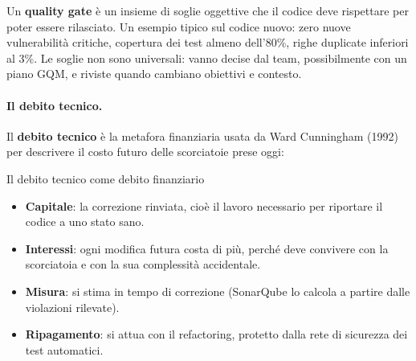 \documentclass[12pt]{extarticle}
\begin{document}
\begin{center}
\end{center}

\noindent Un \textbf{quality gate} è un insieme di soglie oggettive che il codice deve rispettare per poter essere rilasciato. Un esempio tipico sul codice nuovo: zero nuove vulnerabilità critiche, copertura dei test almeno dell'80\%, righe duplicate inferiori al 3\%. Le soglie non sono universali: vanno decise dal team, possibilmente con un piano GQM, e riviste quando cambiano obiettivi e contesto.

\paragraph{Il debito tecnico.}
Il \textbf{debito tecnico} è la metafora finanziaria usata da Ward Cunningham (1992) per descrivere il costo futuro delle scorciatoie prese oggi:

\begin{cbox}{Il debito tecnico come debito finanziario}
\begin{itemize}
    \item \textbf{Capitale}: la correzione rinviata, cioè il lavoro necessario per riportare il codice a uno stato sano.
    \item \textbf{Interessi}: ogni modifica futura costa di più, perché deve convivere con la scorciatoia e con la sua complessità accidentale.
    \item \textbf{Misura}: si stima in tempo di correzione (SonarQube lo calcola a partire dalle violazioni rilevate).
    \item \textbf{Ripagamento}: si attua con il refactoring, protetto dalla rete di sicurezza dei test automatici.
\end{itemize}
\end{cbox}
\end{document}

